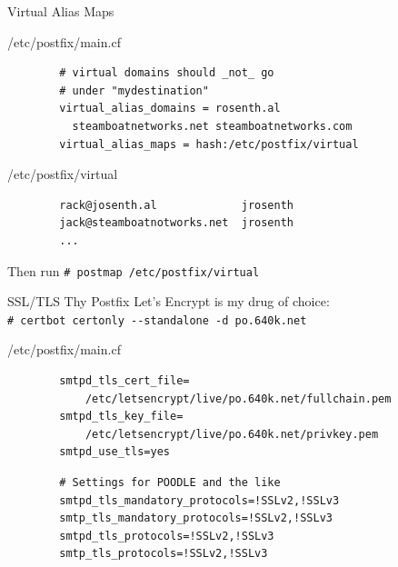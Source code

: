 \documentclass{lug}
\begin{document}
\begin{frame}[fragile]{Virtual Alias Maps}
    \begin{block}{\ttfamily /etc/postfix/main.cf}
    \begin{verbatim}
        # virtual domains should _not_ go
        # under "mydestination"
        virtual_alias_domains = rosenth.al
          steamboatnetworks.net steamboatnetworks.com
        virtual_alias_maps = hash:/etc/postfix/virtual
    \end{verbatim}
    \end{block}

    \begin{block}{\ttfamily /etc/postfix/virtual}
    \begin{verbatim}
        rack@josenth.al             jrosenth
        jack@steamboatnotworks.net  jrosenth
        ...
    \end{verbatim}
    \end{block}

    Then run \verb|# postmap /etc/postfix/virtual|
\end{frame}

\begin{frame}[fragile]{SSL/TLS Thy Postfix}
    Let's Encrypt is my drug of choice: \\
    {\small \verb|# certbot certonly --standalone -d po.640k.net|}
    \pause

    \begin{block}{\ttfamily /etc/postfix/main.cf}
    \begin{verbatim}
        smtpd_tls_cert_file=
            /etc/letsencrypt/live/po.640k.net/fullchain.pem
        smtpd_tls_key_file=
            /etc/letsencrypt/live/po.640k.net/privkey.pem
        smtpd_use_tls=yes
    \end{verbatim}
    \pause
    \begin{verbatim}
        # Settings for POODLE and the like
        smtpd_tls_mandatory_protocols=!SSLv2,!SSLv3
        smtp_tls_mandatory_protocols=!SSLv2,!SSLv3
        smtpd_tls_protocols=!SSLv2,!SSLv3
        smtp_tls_protocols=!SSLv2,!SSLv3
    \end{verbatim}
    \end{block}
\end{frame}
\end{document}
